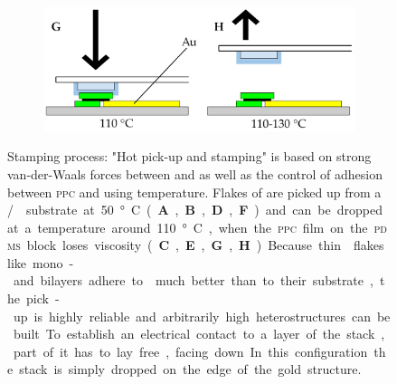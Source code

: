 \begin{figure}[t]
\begin{subfigure}{0.49\textwidth}
\end{subfigure}
\begin{subfigure}{0.49\textwidth}
	\includegraphics[width=\textwidth]{stamp_gh}
\end{subfigure}
\caption{Stamping process: "Hot pick-up and stamping" is based on strong van-der-Waals forces between \hbng and \tmds as well as the control of adhesion between \textsc{ppc} and \hbng using temperature. Flakes of \hbng are picked up from a \si/\sio substrate at 50 °C (\textbf{A}, \textbf{B}, \textbf{D}, \textbf{F}) and can be dropped at a temperature around 110 °C, when the \textsc{ppc} film on the \textsc{pdms} block loses viscosity (\textbf{C}, \textbf{E}, \textbf{G}, \textbf{H}). Because thin \tmdg flakes like mono- and bilayers adhere to \hbng much better than to their substrate, the pick-up is highly reliable and arbitrarily high heterostructures can be built. To establish an electrical contact to a layer of the stack, part of it has to lay free, facing down. In this configuration the stack is simply dropped on the edge of the gold structure.}
	\label{stamping}
\end{figure}

